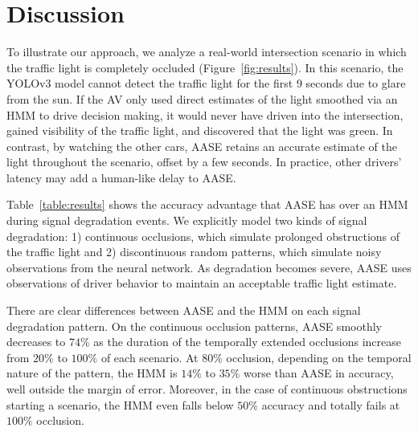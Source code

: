 \documentclass[letterpaper,10pt,conference]{ieeeconf}
\begin{document}
\section{Discussion}

To illustrate our approach, we analyze a real-world intersection scenario in which the traffic light is completely occluded (Figure~\ref{fig:results}). In this scenario, the YOLOv3 model cannot detect the traffic light for the first 9 seconds due to glare from the sun. If the AV only used direct estimates of the light smoothed via an HMM to drive decision making, it would never have driven into the intersection, gained visibility of the traffic light, and discovered that the light was green. In contrast, by watching the other cars, AASE retains an accurate estimate of the light throughout the scenario, offset by a few seconds. In practice, other drivers' latency may add a human-like delay to AASE.

Table~\ref{table:results} shows the accuracy advantage that AASE has over an HMM during signal degradation events. We explicitly model two kinds of signal degradation: 1) continuous occlusions, which simulate prolonged obstructions of the traffic light and 2) discontinuous random patterns, which simulate noisy observations from the neural network. As degradation becomes severe, AASE uses observations of driver behavior to maintain an acceptable traffic light estimate.

There are clear differences between AASE and the HMM on each signal degradation pattern. On the continuous occlusion patterns, AASE smoothly decreases to $74\%$ as the duration of the temporally extended occlusions increase from $20\%$ to $100\%$ of each scenario. At $80\%$ occlusion, depending on the temporal nature of the pattern, the HMM is $14\%$ to $35\%$ worse than AASE in accuracy, well outside the margin of error. Moreover, in the case of continuous obstructions starting a scenario, the HMM even falls below $50\%$ accuracy and totally fails at $100\%$ occlusion.
\end{document}
